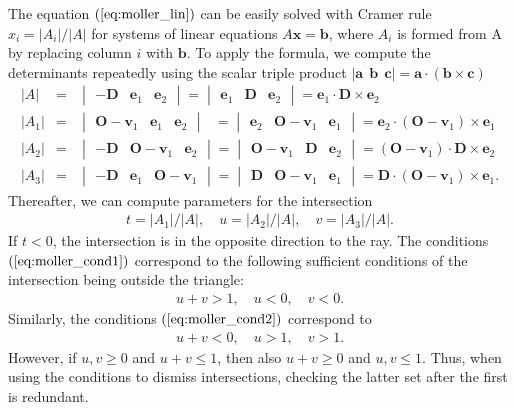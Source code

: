 \documentclass [12pt, a4paper] {article}
\newcommand{\vc}[1]
{
	\boldsymbol{#1}
}
\begin{document}
The equation $(\ref{eq:moller_lin})$ can be easily solved with Cramer rule 
$x_i = |A_i|/|A|$ for systems of linear equations $A\vc x=\vc b$, 
where $A_i$ is formed from A by replacing column $i$ with $\vc b$.
To apply the formula, we compute the determinants repeatedly using the 
scalar triple product $|\vc a\:\:\vc b\:\:\vc c| = \vc a\cdot(\vc b\times\vc c)$
\begin{eqnarray}
    |A| 
    &=& 
    \begin {vmatrix}
     -\vc D & \vc e_1 & \vc e_2
    \end {vmatrix}
    =
    \begin {vmatrix}
       \vc e_1 & \vc D &\vc e_2
    \end {vmatrix}
    = 
    \vc e_1\cdot\vc D\times\vc e_2
    \\
    |A_1| 
    &=& 
    \begin {vmatrix}
        \vc O - \vc v_1 & \vc e_1 & \vc e_2
    \end {vmatrix}
    \:\:\:=
    \begin {vmatrix}
       \vc e_2 & \vc O - \vc v_1 & \vc e_1
    \end {vmatrix}
    = 
    \vc e_2 \cdot (\vc O - \vc v_1)\times \vc e_1
    \\
    |A_2| 
    &=& 
    \begin {vmatrix}
        -\vc D & \vc O - \vc v_1 & \vc e_2
    \end {vmatrix}
    =
    \begin {vmatrix}
        \vc O - \vc v_1 & \vc D & \vc e_2
    \end {vmatrix}
    = 
    (\vc O - \vc v_1)\cdot \vc D \times \vc e_2
    \\
    |A_3| 
    &=& 
    \begin {vmatrix}
        -\vc D & \vc e_1 & \vc O - \vc v_1 
    \end {vmatrix}
    =
    \begin {vmatrix}
        \vc D & \vc O - \vc v_1 & \vc e_1
    \end {vmatrix}
    = 
    \vc D\cdot (\vc O - \vc v_1) \times \vc e_1.
\end {eqnarray}
Thereafter, we can compute parameters for the intersection
\begin {eqnarray}
    t = |A_1|/|A|, \quad u = |A_2|/|A|, \quad v = |A_3|/|A|.
\end {eqnarray}
If $t<0$, the intersection is in the opposite direction to the ray.
The conditions $(\ref{eq:moller_cond1})$ correspond to the following sufficient 
conditions of the intersection being outside the triangle:
\begin {eqnarray}
    u+v > 1, \quad u < 0, \quad v < 0.
\end {eqnarray}
Similarly, the conditions $(\ref{eq:moller_cond2})$ correspond to 
\begin {eqnarray}
    u + v < 0 , \quad u > 1, \quad v > 1.
\end {eqnarray}
However, if $u, v\geq 0$ and $u+v \leq 1$, then also $u+v\geq 0$ and $u,v\leq 1$. Thus, 
when using the conditions to dismiss intersections, checking the latter set after 
the first is redundant.
\end{document}
